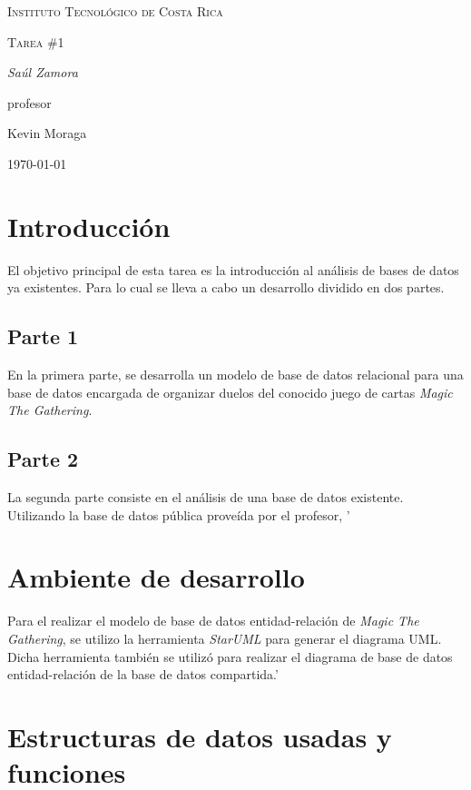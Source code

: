 \documentclass{IEEEtran}
\begin{document}
\begin{titlepage}
  \centering
  {\scshape\LARGE Instituto Tecnol\'ogico de Costa Rica \par}
  \vspace{1cm}
  {\scshape\Large Tarea \#1\par}
  \vspace{1.5cm}
  {\Large\itshape Sa\'ul Zamora\par}
  \vfill
  profesor\par
  Kevin Moraga \textsc{}

  \vfill

  {\large \today\par}
\end{titlepage}

\section{Introducci\'on}
El objetivo principal de esta tarea es la introducci\'on al an\'alisis de bases de datos ya existentes. Para lo cual se lleva a cabo un desarrollo dividido en dos partes.

\subsection{Parte 1}
En la primera parte, se desarrolla un modelo de base de datos relacional para una base de datos encargada de organizar duelos del conocido juego de cartas \emph{Magic The Gathering}.

\subsection{Parte 2}
La segunda parte consiste en el an\'alisis de una base de datos existente. Utilizando la base de datos p\'ublica prove\'ida por el profesor, '

\section{Ambiente de desarrollo}
Para el realizar el modelo de base de datos entidad-relaci\'on de \emph{Magic The Gathering}, se utilizo la herramienta \emph{StarUML} para generar el diagrama UML. Dicha herramienta tambi\'en se utiliz\'o para realizar el diagrama de base de datos entidad-relaci\'on de la base de datos compartida.'

\section{Estructuras de datos usadas y funciones}
\end{document}
